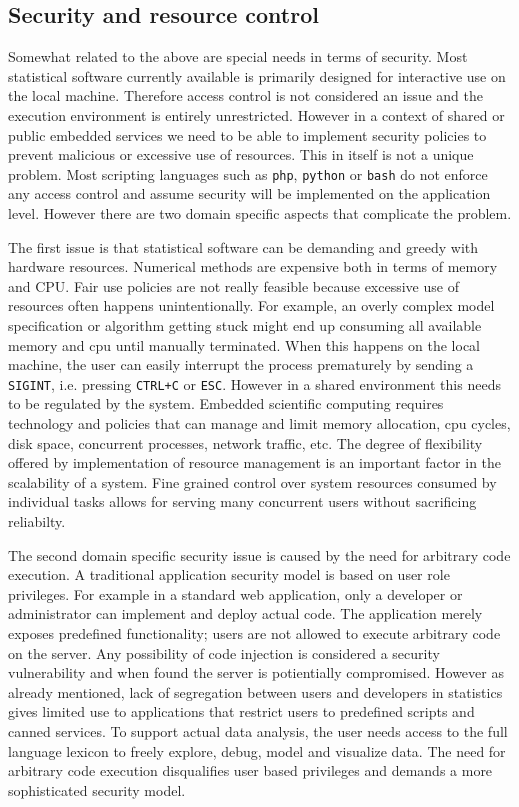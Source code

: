 \documentclass{article}
\begin{document}
\subsection{Security and resource control}

Somewhat related to the above are special needs in terms of security. Most statistical software currently available is primarily designed for interactive use on the local machine. Therefore access control is not considered an issue and the execution environment is entirely unrestricted. However in a context of shared or public embedded services we need to be able to implement security policies to prevent malicious or excessive use of resources. This in itself is not a unique problem. Most scripting languages such as \texttt{php}, \texttt{python} or \texttt{bash} do not enforce any access control and assume security will be implemented on the application level. However there are two domain specific aspects that complicate the problem. 

The first issue is that statistical software can be demanding and greedy with hardware resources. Numerical methods are expensive both in terms of memory and CPU. Fair use policies are not really feasible because excessive use of resources often happens unintentionally. For example, an overly complex model specification or algorithm getting stuck might end up consuming all available memory and cpu until manually terminated. When this happens on the local machine, the user can easily interrupt the process prematurely by sending a \texttt{SIGINT}, i.e. pressing \texttt{CTRL+C} or \texttt{ESC}. However in a shared environment this needs to be regulated by the system. Embedded scientific computing requires technology and policies that can manage and limit memory allocation, cpu cycles, disk space, concurrent processes, network traffic, etc. The degree of flexibility offered by implementation of resource management is an important factor in the scalability of a system. Fine grained control over system resources consumed by individual tasks allows for serving many concurrent users without sacrificing reliabilty. 

The second domain specific security issue is caused by the need for arbitrary code execution. A traditional application security model is based on user role privileges. For example in a standard web application, only a developer or administrator can implement and deploy actual code. The application merely exposes predefined functionality; users are not allowed to execute arbitrary code on the server. Any possibility of code injection is considered a security vulnerability and when found the server is potientially compromised. However as already mentioned, lack of segregation between users and developers in statistics gives limited use to applications that restrict users to predefined scripts and canned services. To support actual data analysis, the user needs access to the full language lexicon to freely explore, debug, model and visualize data. The need for arbitrary code execution disqualifies user based privileges and demands a more sophisticated security model.
\end{document}
